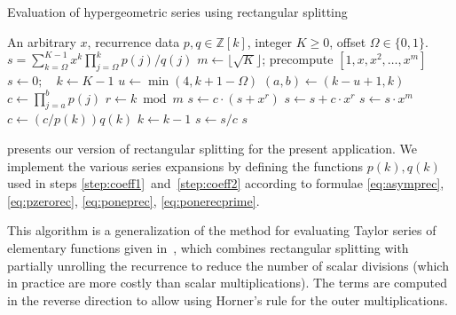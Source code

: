 \documentclass[nohypdvips,review]{siamart0216}
\begin{document}
\begin{algorithm}[h!]
  \caption{Evaluation of hypergeometric series using rectangular splitting}
  \small
  \label{alg:hyprs}
  \begin{algorithmic}[1]
    \Require An arbitrary $x$, recurrence data $p, q \in \mathbb{Z}[k]$, integer $K \ge 0$, offset $\Omega \in \{0,1\}$.
    \Ensure $s = \sum_{k=\Omega}^{K-1} x^k \prod_{j=\Omega}^k p(j) / q(j)$
    \State $m \gets \lfloor \sqrt K \rfloor$; precompute $[1, x, x^2, \ldots, x^m]$ 
    \State $s \gets 0; \quad k \gets K - 1$
        \State $u \gets \min(4, k + 1 - \Omega)$  
        \State $(a, b) \gets (k - u + 1, k)$  
        \State \label{step:coeff1} $c \gets \prod_{j=a}^b p(j)$ 
            \State $r \gets k \bmod m$
                \State $s \gets c \cdot (s + x^r)$ 
            \Else
                \State $s \gets s + c \cdot x^r$ 
            \EndIf
                \State $s \gets s \cdot x^m$ 
            \EndIf
            \State \label{step:coeff2} $c \gets (c / p(k)) q(k)$ 
            \State $k \gets k - 1$
        \EndWhile
        \State $s \gets s / c$
    \EndWhile
    \State \Return $s$
  \end{algorithmic}
\end{algorithm}

 presents our version of rectangular splitting
for the present application.
We implement the various series expansions by defining
the functions $p(k), q(k)$ used in steps
\ref{step:coeff1}~and~\ref{step:coeff2} according to formulae
\cref{eq:asymprec}, \cref{eq:pzerorec},
\cref{eq:poneprec}, \cref{eq:ponerecprime}.

This algorithm is a generalization of the
method for evaluating Taylor series of elementary
functions given in~\cite{Johansson2015elementary},
which combines rectangular splitting
with partially unrolling the recurrence to reduce the number of scalar divisions
(which in practice are more costly than scalar multiplications).
The terms are computed in the reverse direction to allow
using Horner's rule for the outer
multiplications.
\end{document}
